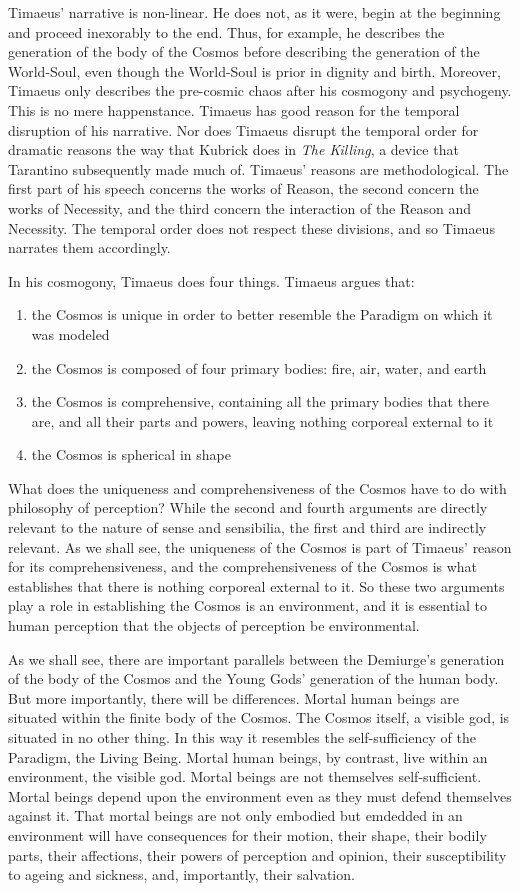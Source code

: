 Timaeus' narrative is non-linear. He does not, as it were, begin at the beginning and proceed inexorably to the end. Thus, for example, he describes the generation of the body of the Cosmos before describing the generation of the World-Soul, even though the World-Soul is prior in dignity and birth. Moreover, Timaeus only describes the pre-cosmic chaos after his cosmogony and psychogeny. This is no mere happenstance. Timaeus has good reason for the temporal disruption of his narrative. Nor does Timaeus disrupt the temporal order for dramatic reasons the way that Kubrick does in \emph{The Killing}, a device that Tarantino subsequently made much of. Timaeus' reasons are methodological. The first part of his speech concerns the works of Reason, the second concern the works of Necessity, and the third concern the interaction of the Reason and Necessity. The temporal order does not respect these divisions, and so Timaeus narrates them accordingly.

In his cosmogony, Timaeus does four things. Timaeus argues that:
\begin{enumerate}[(1)]
	\item the Cosmos is unique in order to better resemble the Paradigm on which it was modeled
	\item the Cosmos is composed of four primary bodies: fire, air, water, and earth
	\item the Cosmos is comprehensive, containing all the primary bodies that there are, and all their parts and powers, leaving nothing corporeal external to it
	\item the Cosmos is spherical in shape
\end{enumerate}
What does the uniqueness and comprehensiveness of the Cosmos have to do with philosophy of perception? While the second and fourth arguments are directly relevant to the nature of sense and sensibilia, the first and third are indirectly relevant. As we shall see, the uniqueness of the Cosmos is part of Timaeus' reason for its comprehensiveness, and the comprehensiveness of the Cosmos is what establishes that there is nothing corporeal external to it. So these two arguments play a role in establishing the Cosmos is an environment, and it is essential to human perception that the objects of perception be environmental.

As we shall see, there are important parallels between the Demiurge's generation of the body of the Cosmos and the Young Gods' generation of the human body. But more importantly, there will be differences. Mortal human beings are situated within the finite body of the Cosmos. The Cosmos itself, a visible god, is situated in no other thing. In this way it resembles the self-sufficiency of the Paradigm, the Living Being. Mortal human beings, by contrast, live within an environment, the visible god. Mortal beings are not themselves self-sufficient. Mortal beings depend upon the environment even as they must defend themselves against it. That mortal beings are not only embodied but emdedded in an environment will have consequences for their motion, their shape, their bodily parts, their affections, their powers of perception and opinion, their susceptibility to ageing and sickness, and, importantly, their salvation.

